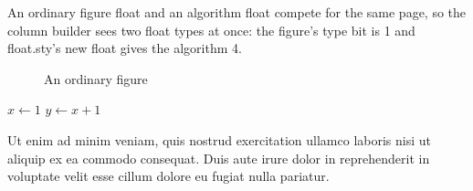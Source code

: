 \documentclass{article}
\begin{document}
An ordinary figure float and an algorithm float compete for the same page,
so the column builder sees two float types at once: the figure's type bit is
1 and float.sty's new float gives the algorithm 4.

\begin{figure}[t]
\caption{An ordinary figure}
\end{figure}

\begin{algorithm}[t]
\caption{And an algorithm beside it}
\begin{algorithmic}[1]
\State $x \gets 1$
\State $y \gets x + 1$
\end{algorithmic}
\end{algorithm}

Ut enim ad minim veniam, quis nostrud exercitation ullamco laboris nisi ut
aliquip ex ea commodo consequat. Duis aute irure dolor in reprehenderit in
voluptate velit esse cillum dolore eu fugiat nulla pariatur.
\end{document}

